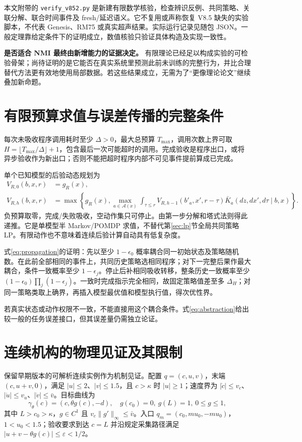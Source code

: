 \documentclass[11pt,a4paper,fontset=fandol]{ctexart}
\theoremstyle{definition}\newtheorem{definition}[theorem]{定义}
\theoremstyle{remark}\newtheorem{remark}[theorem]{说明}
\numberwithin{equation}{section}
\begin{document}
本文附带的 \texttt{verify\_v852.py} 是新建有限数学核验，检查辨识反例、共同策略、关联分解、联合时间事件及 fresh/延迟语义。它不复用或声称恢复 V8.5 缺失的实验脚本，不代表 Genesis、RM75 或真实超声结果。实际运行记录见随包 JSON。一般定理靠给定条件下的证明成立，数值核验只验证具体构造及实现一致性。

\textbf{是否适合 NMI 最终由新增能力的证据决定。} 有限理论已经足以构成实验的可检验骨架；尚待证明的是它能否在真实系统里预测此前未训练的完整行为，并比合理替代方法更有效地使用局部数据。若这些结果成立，无需为了“更像理论论文”继续叠加新命题。

\appendix
\section{有限预算求值与误差传播的完整条件}
\label{app:dp}
每次未吸收程序调用耗时至少 $\Delta>0$，最大总预算 $T_{\max}$，调用次数上界可取
$H=\lfloor T_{\max}/\Delta\rfloor+1$，包含最后一次可能超时的调用。完成验收是程序出口，或将异步验收作为新出口；否则不能把超时程序内部不可见事件提前算成已完成。

单个已知模型的后验动态规划为
\begin{align}
 V_{R,0}(b,x,r)&=g_R(x),\\
 V_{R,h}(b,x,r)&=\max\left\{g_R(x),\max_{a\in\mathcal A(x)}
 \int_{\tau\le r}V_{R,h-1}(b'_a,x',r-\tau)
 \bar K_a(dz,dx',d\tau\mid b,x)\right\}.
 \label{eq:dp}
\end{align}
负预算取零，完成/失败吸收，空动作集只可停止。由第一步分解和塔式法则得此递推。它是单模型半 Markov/POMDP 求值，不替代第\ref{sec:lp}节全局共同策略 LP。有限动作也不意味着连续后验计算自动具有低复杂度。

式\eqref{eq:propagation}的证明：先以至少 $1-\epsilon_0$ 概率耦合同一初始状态及策略随机数。在此前全部相同的事件上，共同历史策略选相同程序；对下一完整后果作最大耦合，条件一致概率至少 $1-\epsilon_j$。停止后补相同吸收转移，整条历史一致概率至少 $(1-\epsilon_0)\prod_j(1-\epsilon_j)$。一致时完成指示完全相同，故固定策略值差至多 $\Delta_H$；对同一策略类取上确界，再插入模型最优值和模型执行值，得次优性界。

若真实状态或动作权限不一致，不能直接用这个耦合条件。式\eqref{eq:abstraction}给出较一般的任务误差接口，但其误差量仍需独立论证。

\section{连续机构的物理见证及其限制}
\label{app:physical}
保留早期版本的可解析连续实例作为机制见证\cite{v84,v85}。配置 $q=(c,u,v)$，末端 $(c,u+v,0)$，满足 $|u|\le2$、$|v|\le1.5$，且 $c>\kappa$ 时 $|u|\ge1$；速度界为 $|\dot c|\le v_c$、$|\dot u|\le v_u$、$|\dot v|\le\bar v$。目标曲线为
\begin{equation}
 \gamma_\theta(c)=(c,\theta g(c),-d),\quad
 g(c_0)=0,\ g(L)=1,\ 0\le g\le1,
\end{equation}
其中 $L>c_0>\kappa$，$g\in C^1$ 且 $v_c\|g'\|_\infty\le\bar v$。入口 $q_m=(c_0,mu_0,-mu_0)$，$1<u_0<1.5$；验收要求到达 $c=L$ 并沿规定采集路径满足 $|u+v-\theta g(c)|\le\varepsilon<1/2$。
\end{document}
